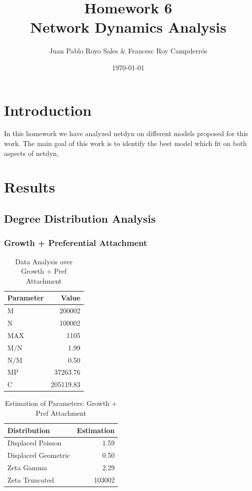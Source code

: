 \documentclass[12pt, a4paper]{article}
\title{%
      Homework 6\\
      Network Dynamics Analysis\\
}
\author{Juan Pablo Royo Sales \& Francesc Roy Campderrós}
\affil{Universitat Politècnica de Catalunya}
\date\today
\begin{document}
\maketitle

\tableofcontents

\section{Introduction}
In this homework we have analyzed \acrfull{netdyn} on different models proposed for this work.
The main goal of this work is to identify the best model which fit on both aspects of \acrshort{netdyn}, 

\section{Results}
\subsection{Degree Distribution Analysis}
\subsubsection{Growth + Preferential Attachment}

\begin{table}[H]
    \centering
    \begin{tabular}{l r}
        Parameter & Value\\
        \hline              
        M & 200002\\
        N & 100002\\
        MAX & 1105\\
        M/N & 1.99\\
        N/M & 0.50\\
        MP & 37263.76\\
        C & 205119.83
    \end{tabular}
    \caption{Data Analysis over Growth + Pref Attachment}
    \label{table:grow_pref_att_1}
\end{table}

\begin{table}[H]
    \centering
    \begin{tabular}{l r}
        Distribution & Estimation\\
        \hline
        Displaced Poisson & 1.59\\
        Displaced Geometric & 0.50\\
        Zeta Gamma & 2.29\\ 
        Zeta Truncated & 103002\\
    \end{tabular}
    \caption{Estimation of Parameters: Growth + Pref Attachment}
    \label{table:grow_pref_att_2}
\end{table}
\end{document}

